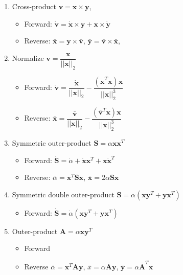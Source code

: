 \documentclass{article}
\begin{document}
\begin{enumerate}
\item Cross-product $\mathbf{v} = \mathbf{x} \times \mathbf{y}$,
\begin{itemize}
\item Forward: $\dot{\mathbf{v}} = \dot{\mathbf{x}} \times \mathbf{y} + \mathbf{x} \times \dot{\mathbf{y}}$
\item Reverse: $\bar{\mathbf{x}} = \mathbf{y} \times \bar{\mathbf{v}}$, $\bar{\mathbf{y}} = \bar{\mathbf{v}} \times \bar{\mathbf{x}}$,
\end{itemize}


\item Normalize $\mathbf{v} = \dfrac{\mathbf{x}}{||\mathbf{x}||_{2}}$
\begin{itemize}
\item Forward: $\dot{\mathbf{v}} = \dfrac{\dot{\mathbf{x}}}{||\mathbf{x}||_{2}} - \dfrac{(\dot{\mathbf{x}}^{T} \mathbf{x}) \mathbf{x}}{||\mathbf{x}||_{2}^{3}}$
\item Reverse: $\bar{\mathbf{x}} = \dfrac{\bar{\mathbf{v}}}{||\mathbf{x}||_{2}} - \dfrac{(\bar{\mathbf{v}}^{T} \mathbf{x}) \mathbf{x}}{||\mathbf{x}||_{2}^{3}}$
\end{itemize}

\item Symmetric outer-product $\mathbf{S} = \alpha \mathbf{x}\mathbf{x}^{T}$
\begin{itemize}
\item Forward: $\dot{\mathbf{S}} = \dot{\alpha} + \dot{\mathbf{x}} \mathbf{x}^{T} + \mathbf{x} \dot{\mathbf{x}}^{T}$
\item Reverse: $\bar{\alpha} = \mathbf{x}^{T} \bar{\mathbf{S}} \mathbf{x}$, $\bar{\mathbf{x}} = 2 \alpha \bar{\mathbf{S}} \mathbf{x}$
\end{itemize}

\item Symmetric double outer-product $\mathbf{S} = \alpha (\mathbf{x} \mathbf{y}^{T} + \mathbf{y} \mathbf{x}^{T})$
\begin{itemize}
\item Forward: $\dot{\mathbf{S}} = \dot{\alpha}  (\mathbf{x} \mathbf{y}^{T} + \mathbf{y} \mathbf{x}^{T})$
\end{itemize}

\item Outer-product $\mathbf{A} = \alpha \mathbf{x}\mathbf{y}^{T}$
\begin{itemize}
\item Forward
\item Reverse $\bar{\alpha} = \mathbf{x}^{T} \bar{\mathbf{A}} \mathbf{y}$, $\bar{x} = \alpha \bar{\mathbf{A}} \mathbf{y}$, $\bar{\mathbf{y}} = \alpha \bar{\mathbf{A}}^{T} \mathbf{x}$
\end{itemize}

\end{enumerate}
\end{document}
